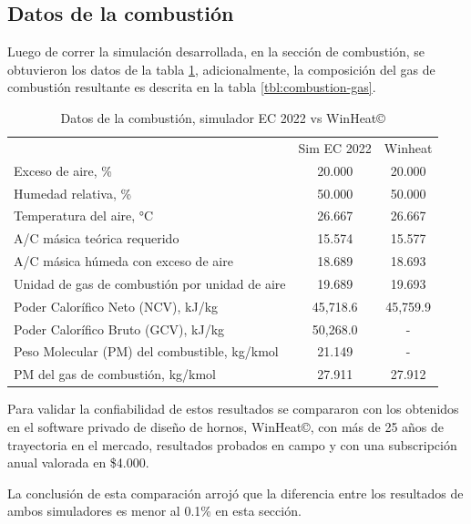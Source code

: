 \subsection{Datos de la combustión}
\par Luego de correr la simulación desarrollada, en la sección de combustión, se obtuvieron los datos de la tabla \ref{tbl:combustion-data}, adicionalmente, la composición del gas de combustión resultante es descrita en la tabla \ref{tbl:combustion-gas}.

\begin{table}
\begin{center}
\caption[Datos de la combustión]{Datos de la combustión, simulador EC 2022 vs WinHeat\copyright}
\label{tbl:combustion-data}
\begin{tabular}{l|c|c}
			& Sim EC 2022 & Winheat \\
	Exceso de aire, \%								& 20.000 & 20.000 \\
	Humedad relativa, \%							& 50.000 & 50.000 \\
	Temperatura del aire, °C						& 26.667 & 26.667 \\
	A/C másica teórica requerido					& 15.574 & 15.577 \\
	A/C másica húmeda con exceso de aire			& 18.689 & 18.693 \\
	Unidad de gas de combustión por unidad de aire  & 19.689 & 19.693 \\
	Poder Calorífico Neto  (NCV), kJ/kg				& 45,718.6 & 45,759.9 \\
	Poder Calorífico Bruto (GCV), kJ/kg				& 50,268.0 & - \\
	Peso Molecular (PM) del combustible, kg/kmol	& 21.149 & - \\
	PM del gas de combustión, kg/kmol				& 27.911 & 27.912 \\
\end{tabular}
\end{center}
\end{table}

\par Para validar la confiabilidad de estos resultados se compararon con los obtenidos en el software privado de diseño de hornos, WinHeat\copyright, con más de 25 años de trayectoria en el mercado, resultados probados en campo y con una subscripción anual valorada en \$4.000.

\par La conclusión de esta comparación arrojó que la diferencia entre los resultados de ambos simuladores es menor al 0.1\% en esta sección.

